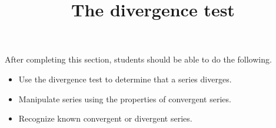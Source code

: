 \documentclass{ximera}
\title{The divergence test}
\begin{document}
\begin{abstract}
\end{abstract}

\maketitle

\begin{sectionOutcomes}

After completing this section, students should be able to do the following.

\begin{itemize}
\item Use the divergence test to determine that a series diverges.
\item Manipulate series using the properties of convergent series.
\item Recognize known convergent or divergent series.
\end{itemize}

\end{sectionOutcomes}
\end{document}
